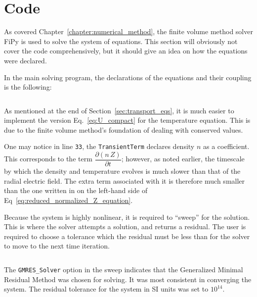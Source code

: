 \chapter{Code}\label{chapter:Code}
As covered Chapter~\ref{chapter:numerical_method}, the finite volume method solver FiPy \cite{guyer_fipy:_2009} is used to solve the system of equations.
This section will obviously not cover the code comprehensively, but it should give an idea on how the equations were declared.

In the main solving program, the declarations of the equations and their coupling is the following:
\inputminted[firstline=22, lastline=43, tabsize=4, breaklines=true, fontsize=\footnotesize, frame=single, linenos=true]{python}{../FiPy_Model/solving_flux.py}
As mentioned at the end of Section~\ref{sec:transport_eqs}, it is much easier to implement the version Eq.~\ref{eq:U_compact} for the temperature equation.
This is due to the finite volume method's foundation of dealing with conserved values.

One may notice in line \texttt{33}, the \texttt{TransientTerm} declares density $n$ as a coefficient.
This corresponds to the term $\dfrac{\partial (n \, Z)}{\partial t}$; however, as noted earlier, the timescale by which the density and temperature evolves is much slower than that of the radial electric field.
The extra term associated with it is therefore much smaller than the one written in on the left-hand side of Eq~\ref{eq:reduced_normalized_Z_equation}.

Because the system is highly nonlinear, it is required to ``sweep'' for the solution.
This is where the solver attempts a solution, and returns a residual.
The user is required to choose a tolerance which the residual must be less than for the solver to move to the next time iteration.
\inputminted[firstline=98, lastline=113, tabsize=4, breaklines=true, fontsize=\footnotesize, frame=single, linenos=true]{python}{../FiPy_Model/solving_flux.py}

The \texttt{GMRES_Solver} option in the sweep indicates that the Generalized Minimal Residual Method was chosen for solving.
It was most consistent in converging the system.
The residual tolerance for the system in SI units was set to $10^{14}$.

